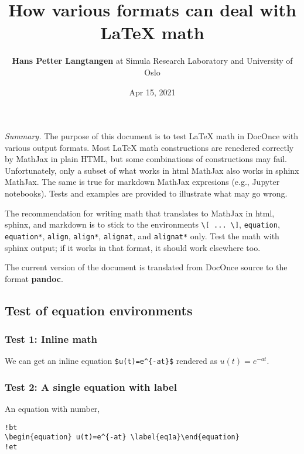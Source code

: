 \documentclass[]{article}
\title{How various formats can deal with LaTeX math}
\author{\textbf{Hans Petter Langtangen} at Simula Research Laboratory and
University of Oslo}
\date{Apr 15, 2021}
\begin{document}
\maketitle

\emph{Summary.} The purpose of this document is to test LaTeX math in
DocOnce with various output formats. Most LaTeX math constructions are
renedered correctly by MathJax in plain HTML, but some combinations of
constructions may fail. Unfortunately, only a subset of what works in
html MathJax also works in sphinx MathJax. The same is true for markdown
MathJax expresions (e.g., Jupyter notebooks). Tests and examples are
provided to illustrate what may go wrong.

The recommendation for writing math that translates to MathJax in html,
sphinx, and markdown is to stick to the environments
\texttt{\textbackslash{}{[}\ ...\ \textbackslash{}{]}},
\texttt{equation}, \texttt{equation*}, \texttt{align}, \texttt{align*},
\texttt{alignat}, and \texttt{alignat*} only. Test the math with sphinx
output; if it works in that format, it should work elsewhere too.

The current version of the document is translated from DocOnce source to
the format \textbf{pandoc}.

\subsection{Test of equation
environments}\label{test-of-equation-environments}

\subsubsection{Test 1: Inline math}\label{test-1-inline-math}

We can get an inline equation \texttt{\$u(t)=e\^{}\{-at\}\$} rendered as
\(u(t)=e^{-at}\).

\subsubsection{Test 2: A single equation with
label}\label{test-2-a-single-equation-with-label}

An equation with number,

\begin{verbatim}
!bt
\begin{equation} u(t)=e^{-at} \label{eq1a}\end{equation}
!et
\end{verbatim}
\end{document}
